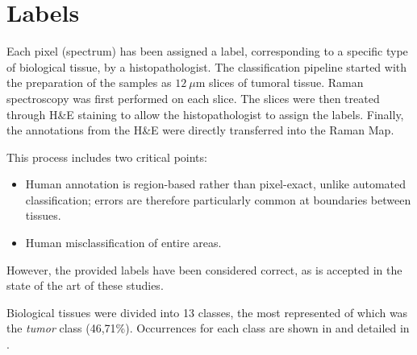 \section{Labels}
\label{sec:labels}

Each pixel (spectrum) has been assigned a label, corresponding to a specific type of biological tissue, by a histopathologist.
The classification pipeline started with the preparation of the samples as $12~\mu\mathrm{m}$ slices of tumoral tissue.
Raman spectroscopy was first performed on each slice. The slices were then treated through H\&E staining to allow the histopathologist to assign the labels. Finally, the annotations from the H\&E were directly transferred into the Raman Map.

This process includes two critical points:

\begin{itemize}
    \item Human annotation is region-based rather than pixel-exact, unlike automated classification; errors are therefore particularly common at boundaries between tissues.
    \item Human misclassification of entire areas.
\end{itemize}

However, the provided labels have been considered correct, as is accepted in the state of the art of these studies.


Biological tissues were divided into 13 classes, the most represented of which was the \textit{tumor} class (46,71\%). Occurrences for each class are shown in  and detailed in .


